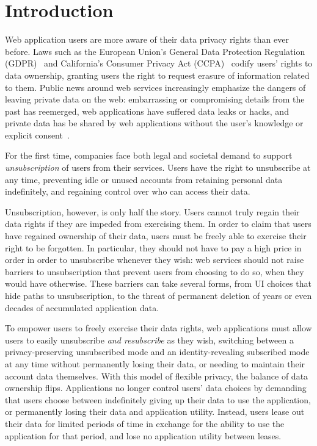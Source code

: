 \section{Introduction}

Web application users are more aware of their data privacy rights than ever before. 
Laws such as the European Union's General Data Protection Regulation (GDPR)~\cite{eu:gdpr} and
California's Consumer Privacy Act (CCPA)~\cite{ca:privacy-act} codify users' rights to 
data ownership, granting users the right to request erasure of information related to them.
%
Public news around web services increasingly emphasize the dangers of leaving private data on the
web: embarrassing or compromising details from the past has reemerged, web applications have 
suffered data leaks or hacks, and private data has be shared by web applications without the user's
knowledge or explicit consent~\cite{nytimes:fb, npr:data}.

%
For the first time, companies face both legal and societal demand to support \emph{unsubscription}
of users from their services. Users have the right to unsubscribe at any time, preventing 
idle or unused accounts from retaining personal data indefinitely, and regaining control over who
can access their data. 
%

%
Unsubscription, however, is only half the story. Users cannot truly regain their data rights if they
are impeded from exercising them.  In order to claim that users have regained ownership of their
data, users must be freely able to exercise their right to be forgotten. In particular, they should
not have to pay a high price in order in order to unsubscribe whenever they wish: web services
should not raise barriers to unsubscription that prevent users from choosing to do so, when they
would have otherwise. These barriers can take several forms, from UI choices that hide paths to
unsubscription, to the threat of permanent deletion of years or even decades of accumulated
application data.

To empower users to freely exercise their data rights, web applications must allow users to easily
unsubscribe \emph{and resubscribe} as they wish, switching between a privacy-preserving unsubscribed
mode and an identity-revealing subscribed mode at any time without permanently losing their data, or
needing to maintain their account data themselves. 
%
With this model of flexible privacy, the balance of data ownership flips. Applications no longer
control users' data choices by demanding that users choose between indefinitely giving up their data
to use the application, or permanently losing their data and application utility.
Instead, users lease out their data for limited periods of time in exchange for the ability to use the application for 
that period, and lose no application utility between leases.
%

